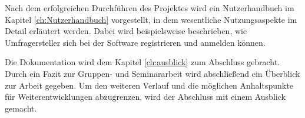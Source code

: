 Nach dem erfolgreichen Durchführen des Projektes wird ein Nutzerhandbuch im Kapitel \vref{ch:Nutzerhandbuch} vorgestellt, in dem wesentliche Nutzungsaspekte im Detail erläutert werden.
Dabei wird beispielsweise beschrieben, wie Umfragersteller sich bei der Software registrieren und anmelden können.

Die Dokumentation wird dem Kapitel \vref{ch:ausblick} zum Abschluss gebracht. 
Durch ein Fazit zur Gruppen- und Seminararbeit wird abschließend ein Überblick zur Arbeit gegeben. 
Um den weiteren Verlauf und die möglichen Anhaltspunkte für Weiterentwicklungen abzugrenzen, wird der Abschluss mit einem Ausblick gemacht.
